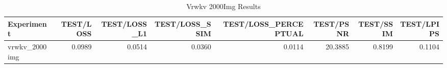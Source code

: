 \begin{table}[htbp]
\centering
\caption{Vrwkv 2000Img Results}
\label{tab:vrwkv_2000img_results}
\begin{tabular}{lrrrrrrr}
\toprule
Experiment & TEST/LOSS & TEST/LOSS_L1 & TEST/LOSS_SSIM & TEST/LOSS_PERCEPTUAL & TEST/PSNR & TEST/SSIM & TEST/LPIPS \\
\midrule
vrwkv_2000img & 0.0989 & 0.0514 & 0.0360 & 0.0114 & 20.3885 & 0.8199 & 0.1104 \\
\bottomrule
\end{tabular}
\end{table}
